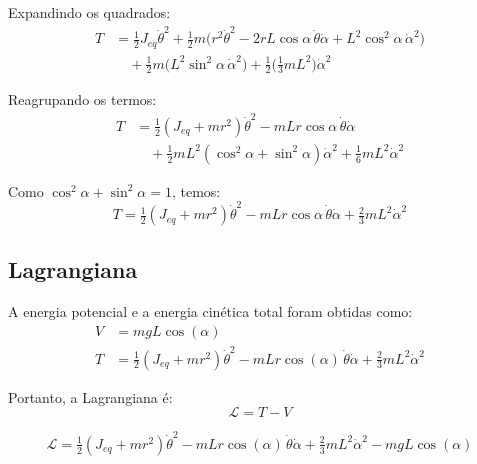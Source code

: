 \documentclass[9pt,a4paper,twocolumn,twoside]{tau-class/tau}
\begin{document}
Expandindo os quadrados:
\begin{align}
    T &= \tfrac{1}{2} J_{eq} \dot{\theta}^2 
        + \tfrac{1}{2} m \big(r^2 \dot{\theta}^2 - 2 r L \cos\alpha \, \dot{\theta}\dot{\alpha} + L^2 \cos^2\alpha \, \dot{\alpha}^2 \big) \nonumber \\
      &\quad + \tfrac{1}{2} m \big(L^2 \sin^2\alpha \, \dot{\alpha}^2\big)
        + \tfrac{1}{2} \Big(\tfrac{1}{3} m L^2\Big) \dot{\alpha}^2
    \label{eq:Ttotal2}
\end{align}

Reagrupando os termos:
\begin{align}
    T &= \tfrac{1}{2}(J_{eq} + m r^2) \dot{\theta}^2 
        - m L r \cos\alpha \, \dot{\theta}\dot{\alpha} \nonumber \\
      &\quad + \tfrac{1}{2} m L^2 (\cos^2\alpha + \sin^2\alpha)\dot{\alpha}^2
        + \tfrac{1}{6} m L^2 \dot{\alpha}^2
    \label{eq:Ttotal3}
\end{align}

Como $\cos^2\alpha + \sin^2\alpha = 1$, temos:
\begin{equation}
    T = \tfrac{1}{2}(J_{eq} + m r^2) \dot{\theta}^2 
        - m L r \cos\alpha \, \dot{\theta}\dot{\alpha} 
        + \tfrac{2}{3} m L^2 \dot{\alpha}^2
    \label{eq:TtotalFinal}
\end{equation}


\subsection{Lagrangiana}

A energia potencial e a energia cinética total foram obtidas como:
\begin{align}
    V &= m g L \cos(\alpha) \\
    T &= \tfrac{1}{2}(J_{eq} + m r^2)\dot{\theta}^2 
        - m L r \cos(\alpha)\,\dot{\theta}\dot{\alpha}
        + \tfrac{2}{3} m L^2 \dot{\alpha}^2
\end{align}

Portanto, a Lagrangiana é:
\begin{equation}
    \mathcal{L} = T - V
\end{equation}

\begin{equation}
    \mathcal{L} = \tfrac{1}{2}(J_{eq} + m r^2)\dot{\theta}^2
        - m L r \cos(\alpha)\,\dot{\theta}\dot{\alpha}
        + \tfrac{2}{3} m L^2 \dot{\alpha}^2
        - m g L \cos(\alpha)
\end{equation}
\end{document}
